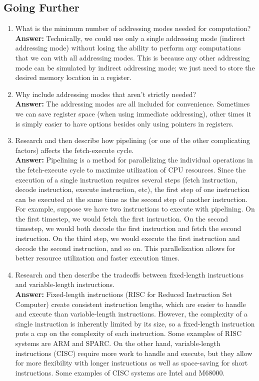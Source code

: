 \documentclass[12pt]{article}
\begin{document}
\subsection*{Going Further}
\begin{enumerate}
    \item What is the minimum number of addressing modes needed for computation? \\
	    \textbf{Answer:} Technically, we could use only a single addressing mode (indirect addressing mode) without losing the ability to perform any computations that we can with all addressing modes. This is because any other addressing mode can be simulated by indirect addressing mode; we just need to store the desired memory location in a register.
    \item Why include addressing modes that aren't strictly needed? \\
	    \textbf{Answer:} The addressing modes are all included for convenience. Sometimes we can save register space (when using immediate addressing), other times it is simply easier to have options besides only using pointers in registers.
    \item Research and then describe how pipelining (or one of the other complicating factors) affects the fetch-execute cycle. \\
	    \textbf{Answer:} Pipelining is a method for parallelizing the individual operations in the fetch-execute cycle to maximize utilization of CPU resources. Since the execution of a single instruction requires several steps (fetch instruction, decode instruction, execute instruction, etc), the first step of one instruction can be executed at the same time as the second step of another instruction. For example, suppose we have two instructions to execute with pipelining. On the first timestep, we would fetch the first instruction. On the second timestep, we would both decode the first instruction and fetch the second instruction. On the third step, we would execute the first instruction and decode the second instruction, and so on. This parallelization allows for better resource utilization and faster execution times.
    \item Research and then describe the tradeoffs between fixed-length instructions and variable-length instructions. \\
	    \textbf{Answer:} Fixed-length instructions (RISC for Reduced Instruction Set Computer) create consistent instruction lengths, which are easier to handle and execute than variable-length instructions. However, the complexity of a single instruction is inherently limited by its size, so a fixed-length instruction puts a cap on the complexity of each instruction. Some examples of RISC systems are ARM and SPARC. On the other hand, variable-length instructions (CISC) require more work to handle and execute, but they allow for more flexibility with longer instructions as well as space-saving for short instructions. Some examples of CISC systems are Intel and M68000.
\end{enumerate}
\end{document}

